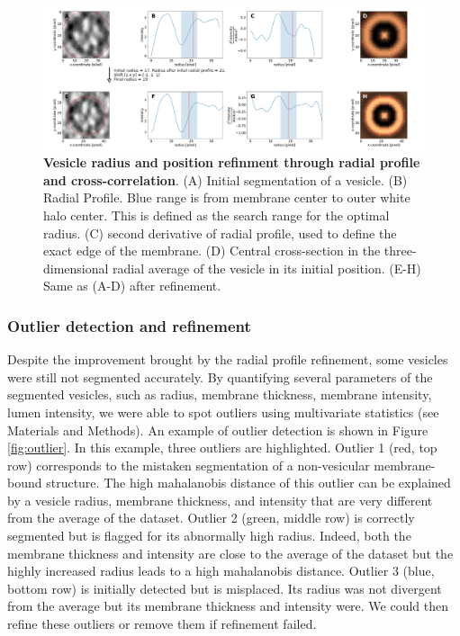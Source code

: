 \begin{figure}
\hypertarget{fig:radial_profile}{%
\centering
\includegraphics[width=15cm,height=\textheight]{images/radial_avg_115-139.svg}
\caption{\textbf{Vesicle radius and position refinment through radial profile and cross-correlation}. (A) Initial segmentation of a vesicle. (B) Radial Profile. Blue range is from membrane center to outer white halo center. This is defined as the search range for the optimal radius. (C) second derivative of radial profile, used to define the exact edge of the membrane. (D) Central cross-section in the three-dimensional radial average of the vesicle in its initial position. (E-H) Same as (A-D) after refinement.}\label{fig:radial_profile}
}
\end{figure}

\hypertarget{outlier-detection-and-refinement}{%
\subsubsection{Outlier detection and refinement}\label{outlier-detection-and-refinement}}

Despite the improvement brought by the radial profile refinement, some vesicles were still not segmented accurately.
By quantifying several parameters of the segmented vesicles, such as radius, membrane thickness, membrane intensity, lumen intensity, we were able to spot outliers using multivariate statistics (see Materials and Methods).
An example of outlier detection is shown in Figure \ref{fig:outlier}.
In this example, three outliers are highlighted.
Outlier 1 (red, top row) corresponds to the mistaken segmentation of a non-vesicular membrane-bound structure.
The high mahalanobis distance of this outlier can be explained by a vesicle radius, membrane thickness, and intensity that are very different from the average of the dataset.
Outlier 2 (green, middle row) is correctly segmented but is flagged for its abnormally high radius.
Indeed, both the membrane thickness and intensity are close to the average of the dataset but the highly increased radius leads to a high mahalanobis distance.
Outlier 3 (blue, bottom row) is initially detected but is misplaced.
Its radius was not divergent from the average but its membrane thickness and intensity were.
We could then refine these outliers or remove them if refinement failed.

